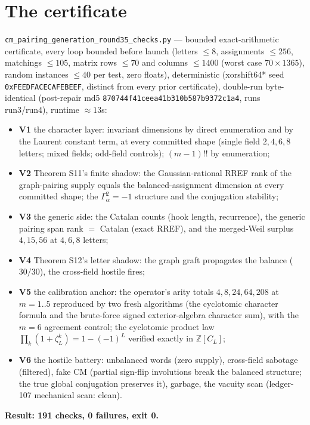 \documentclass[11pt]{article}
\newcommand{\Z}{\mathbb{Z}}
\begin{document}
\section{The certificate}

\texttt{cm\_pairing\_generation\_round35\_checks.py} --- bounded
exact-arithmetic certificate, every loop bounded before launch (letters
$\le8$, assignments $\le256$, matchings $\le105$, matrix rows $\le70$ and
columns $\le1400$ (worst case $70\times1365$),
random instances $\le40$ per test, zero floats), deterministic
(xorshift64* seed \texttt{0xFEEDFACECAFEBEEF}, distinct from every prior
certificate), double-run byte-identical (post-repair md5
\texttt{870744f41ceea41b310b587b9372c1a4}, runs run3/run4), runtime
$\approx13$s:
\begin{itemize}
\item \textbf{V1} the character layer: invariant dimensions by direct
enumeration and by the Laurent constant term, at every committed shape
(single field $2,4,6,8$ letters; mixed fields; odd-field controls);
$(m-1)!!$ by enumeration;
\item \textbf{V2} Theorem S11's finite shadow: the Gaussian-rational
RREF rank of the graph-pairing supply equals the balanced-assignment
dimension at every committed shape; the $\Gamma_\alpha^2=-1$ structure
and the conjugation stability;
\item \textbf{V3} the generic side: the Catalan counts (hook length,
recurrence), the generic pairing span rank $=$ Catalan (exact RREF), and
the merged-Weil surplus $4,15,56$ at $4,6,8$ letters;
\item \textbf{V4} Theorem S12's letter shadow: the graph graft
propagates the balance ($30/30$), the cross-field hostile fires;
\item \textbf{V5} the calibration anchor: the operator's arity totals
$4,8,24,64,208$ at $m=1..5$ reproduced by two fresh algorithms (the
cyclotomic character formula and the brute-force signed exterior-algebra
character sum), with the $m=6$ agreement control; the cyclotomic product
law $\prod_k(1+\zeta_L^k)=1-(-1)^L$ verified exactly in
$\Z[C_L]$;
\item \textbf{V6} the hostile battery: unbalanced words (zero supply),
cross-field sabotage (filtered), fake CM (partial sign-flip involutions
break the balanced structure; the true global conjugation preserves it),
garbage, the vacuity scan (ledger-107 mechanical scan: clean).
\end{itemize}
\textbf{Result: 191 checks, 0 failures, exit 0.}
\end{document}
